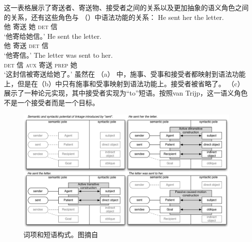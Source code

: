 这一表格展示了寄送者、寄送物、接受者之间的关系以及更加抽象的语义角色之间的关系，还有这些角色与 （）中语法功能的关系：
\eal
\ex 
\gll He sent her the letter.\\
     他 寄送 她 \textsc{det} 信\\
\glt `他寄给她信。'
\ex 
\gll He sent the letter.\\
     他 寄送 \textsc{det} 信\\
\glt `他寄信。'
\ex 
\gll The letter was sent to her.\\
      \textsc{det} 信 \textsc{aux} 寄送 \textsc{prep} 她\\
\glt `这封信被寄送给她了。'
\zl
虽然在 （a） 中，施事、受事和接受者都映射到语法功能上，但是在（b）中只有施事和受事映射到语法功能上。接受者被省略了。 （c）展示了一种论元实现，其中接受者实现为“to”短语。按照van Trijp，这一语义角色不是一个接受者而是一个目标。

\begin{figure}
\includegraphics[width=\textwidth]{Figures/2011-van-Trijp.pdf}
\caption{\label{fig-as-trijp}词项和短语构式。图摘自}
\end{figure}%

